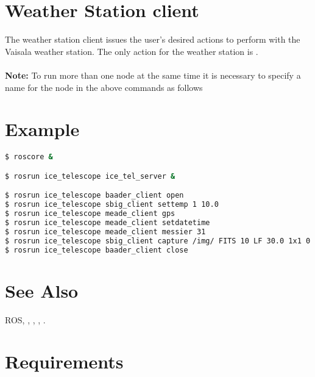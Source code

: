 \documentclass[a4paper,english]{article}
\begin{document}
\section{Weather Station client}

The weather station client issues the user's desired actions to perform with the Vaisala weather station. The only action for the weather station is . \\

    \\

\textbf{Note:} To run more than one  node at the same time it is necessary to specify a name for the node in the above commands as follows 


\section{Example}

\begin{lstlisting}[language=bash, frame=single, breaklines=true]
$ roscore &

$ rosrun ice_telescope ice_tel_server &

$ rosrun ice_telescope baader_client open
$ rosrun ice_telescope sbig_client settemp 1 10.0
$ rosrun ice_telescope meade_client gps
$ rosrun ice_telescope meade_client setdatetime
$ rosrun ice_telescope meade_client messier 31
$ rosrun ice_telescope sbig_client capture /img/ FITS 10 LF 30.0 1x1 0 0 0 0 1 1
$ rosrun ice_telescope baader_client close
\end{lstlisting}


\section{See Also}

ROS, , , , .


\section{Requirements}
\end{document}
